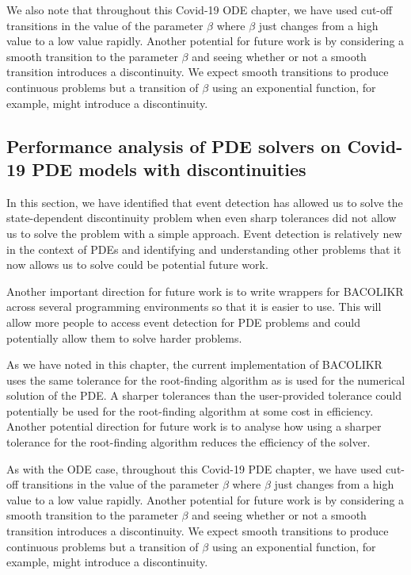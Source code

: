 \documentclass{report}
\begin{document}
We also note that throughout this Covid-19 ODE chapter, we have used cut-off transitions in the value of the parameter $\beta$ where $\beta$ just changes from a high value to a low value rapidly. Another potential for future work is by considering a smooth transition to the parameter $\beta$ and seeing whether or not a smooth transition introduces a discontinuity. We expect smooth transitions to produce continuous problems but a transition of $\beta$ using an exponential function, for example, might introduce a discontinuity.

\subsection{Performance analysis of PDE solvers on Covid-19 PDE models with discontinuities}
In this section, we have identified that event detection has allowed us to solve the state-dependent discontinuity problem when even sharp tolerances did not allow us to solve the problem with a simple approach. Event detection is relatively new in the context of PDEs and identifying and understanding other problems that it now allows us to solve could be potential future work.

Another important direction for future work is to write wrappers for BACOLIKR across several programming environments so that it is easier to use. This will allow more people to access event detection for PDE problems and could potentially allow them to solve harder problems. 

As we have noted in this chapter, the current implementation of BACOLIKR uses the same tolerance for the root-finding algorithm as is used for the numerical solution of the PDE. A sharper tolerances than the user-provided tolerance could potentially be used for the root-finding algorithm at some cost in efficiency. Another potential direction for future work is to analyse how using a sharper tolerance for the root-finding algorithm reduces the efficiency of the solver.

As with the ODE case, throughout this Covid-19 PDE chapter, we have used cut-off transitions in the value of the parameter $\beta$ where $\beta$ just changes from a high value to a low value rapidly. Another potential for future work is by considering a smooth transition to the parameter $\beta$ and seeing whether or not a smooth transition introduces a discontinuity. We expect smooth transitions to produce continuous problems but a transition of $\beta$ using an exponential function, for example, might introduce a discontinuity.
\end{document}
